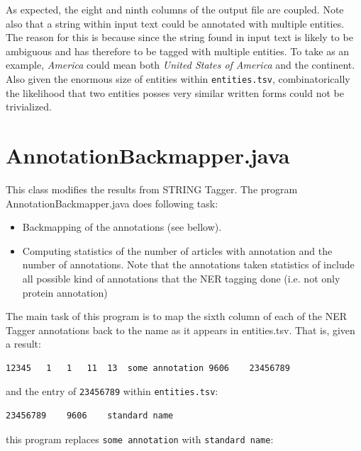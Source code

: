 As expected, the eight and ninth columns of the output file are coupled. Note also that a string within input text could be annotated with multiple entities. The reason for this is because since the string found in input text is likely to be ambiguous and has therefore to be tagged with multiple entities. To take as an example, \textit{America} could mean both \textit{United States of America} and the continent. Also given the enormous size of entities within \texttt{entities.tsv}, combinatorically the likelihood that two entities posses very similar written forms could not be trivialized.


\section{AnnotationBackmapper.java}

\label{sec:AnnotationBackmapper}

This class modifies the results from STRING Tagger. The program AnnotationBackmapper.java does following task:

\begin{itemize}
\item Backmapping of the annotations (see bellow).
\item Computing statistics of the number of articles with annotation and the number of annotations. Note that the annotations taken statistics of include all possible kind of annotations that the NER tagging done (i.e. not only protein annotation)
\end{itemize}

The main task of this program is to map the sixth column of each of the NER Tagger annotations back to the name as it appears in entities.tsv. That is, given a result:

\begin{lstlisting}[breaklines]
12345	1	1	11	13	some annotation	9606	23456789
\end{lstlisting}

and the entry of \texttt{23456789} within \texttt{entities.tsv}:

\begin{lstlisting}[breaklines]
23456789	9606	standard name
\end{lstlisting}

this program replaces \texttt{some annotation} with \texttt{standard name}:

